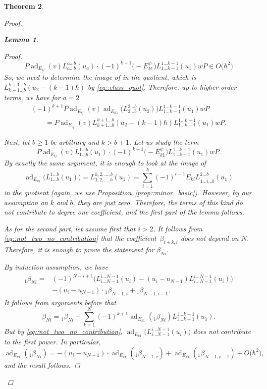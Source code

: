 \documentclass[pdftex]{sigma}
\numberwithin{equation}{section}
\newtheorem{Theorem}{Theorem}[section]
\newtheorem{Lemma}[Theorem]{Lemma}
\DeclareMathOperator{\ad}{ad}
\begin{document}
\begin{Theorem}
\begin{proof}
\begin{Lemma}
\begin{proof}
\begin{equation}
						P\ad_{E_{ij}}(v) L_{a\dots b}^{a\dots b}(u_a) \cdot (-1)^{k+1} \bigl(-E_{k1}^{\psi}\bigr) L_{1\dots k-1}^{1\dots k-1}(u_1) wP \in O\bigl(\hbar^2\bigr)
					\end{equation}
					So, we need to determine the image of  in the quotient, which is $L_{k+1\dots b}^{k+1\dots b}(u_2 - (k-1)\hbar)$ by \eqref{eq::class_quot}. Therefore, up to higher-order terms, we have for $a=2$
					\begin{gather*}
						(-1)^{k+1}P\ad_{E_{ij}}(v)\ad_{E_{k1}}\bigl(L_{2\dots b}^{2\dots b}(u_2)\bigr) L_{1\dots k-1}^{1\dots k-1}(u_1)w P \\
						\qquad=P\ad_{E_{ij}}(v) L_{k+1\dots b}^{k+1\dots b}(u_2-(k-1)\hbar) L_{1\dots k-1}^{1\dots k-1}(u_1) wP.
					\end{gather*}
					
					Next, let $b\geq 1$ be arbitrary and $k>b+1$. Let us study the term
					\[
					P\ad_{E_{ij}}(v) L_{1 \dots b}^{1\dots b}(u_1) \cdot (-1)^{k+1} \bigl(-E_{k1}^{\psi}\bigr) L_{1\dots k-1}^{1\dots k-1}(u_1) wP.
					\]
					By exactly the same argument, it is enough to look at the image of
					\[
					\ad_{E_{k1}}\bigl(L_{1\dots b}^{1\dots b}(u_1)\bigr) = L_{1,2,\dots,b}^{k,2,\dots,b}(u_1) = \sum\limits_{i=1}^b (-1)^{i-1} E_{ki} L_{1\dots \hat{i} \dots b}^{2\dots b}(u_1)
					\]
					in the quotient (again, we use Proposition~\ref{prop::minor_basic}). However, by our assumption on $k$ and $b$, they are just zero. Therefore, the terms of this kind do not contribute to degree one coefficient, and the first part of the lemma follows.
					
					As for the second part, let assume first that $i>2$. It follows from \eqref{eq::not_two_no_contribution} that the coefficient~$\beta_{i+k,i}$ does not depend on $N$. Therefore, it is enough to prove the statement for $\beta_{Ni}$.
					
					By induction assumption, we have
					\begin{align*}
							{}_1\beta_{Ni}
							={}&(-1)^{N-i+1}\bigl(L_{i\dots N-1}^{i\dots N-1}(u_i) - (u_i - u_{N-1}) L_{i \dots N-1}^{i \dots N-1}(u_i)\bigr)\\
&- (u_i - u_{N-1}) \cdot {}_1\beta_{N-1,i} + {}_1\beta_{N-1,i-1}.
					\end{align*}
					It follows from arguments before that
					\[
					\beta_{Ni} = {}_1 \beta_{Ni} + \sum\limits_{k=1}^{N}	(-1)^{k+1} \ad_{E_{k1}} ({}_1 \beta_{Ni}) L_{1\dots k-1}^{1\dots k-1}(u_1).
					\]
					But by \eqref{eq::not_two_no_contribution}, $\ad_{E_{k1}}\bigl(L_{i\dots N-1}^{i \dots N-1}(u_i)\bigr)$ does not contribute to the first power. In particular,
					\[
					\ad_{E_{k1}}({}_1 \beta_{Ni}) =- (u_i - u_{N-1})\cdot \ad_{E_{k1}}({}_1\beta_{N-1,i}) + \ad_{E_{k1}}({}_1\beta_{N-1,i-1}) + O\bigl(\hbar^2\bigr),
					\]
					and the result follows.
					

\end{proof}
\end{Lemma}
\end{proof}
\end{Theorem}
\end{document}
